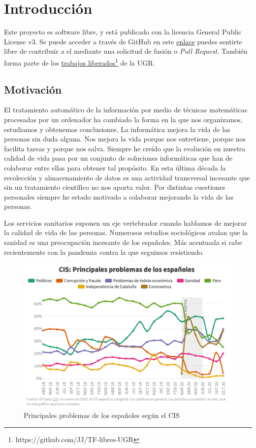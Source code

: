\chapter{Introducción}
Este proyecto es software libre, y está publicado con la licencia \cite{gplv3} General Public License v3.
Se puede acceder a través de GitHub en este \href{https://github.com/pablojjimenez/TFG}{enlace} puedes sentirte libre de contribuir a 
el mediante una solicitud de fusión o \textit{Pull Request}. También forma parte de los \href{https://github.com/JJ/TF-libres-UGR}{trabajos liberados}\footnote{https://github.com/JJ/TF-libres-UGR} de la UGR.

\section{Motivación} 
El tratamiento automático de la información por medio de técnicas matemáticas procesadas por un ordenador 
ha cambiado la forma en la que nos organizamos, estudiamos y obtenemos conclusiones. La informática mejora 
la vida de las personas sin duda alguna. Nos mejora la vida porque nos entretiene, porque nos facilita 
tareas y porque nos salva. Siempre he creído que la evolución en nuestra calidad de vida pasa por un 
conjunto de soluciones informáticas que han de colaborar entre ellas para obtener tal propósito. 
En esta última década la recolección y almacenamiento de datos es una actividad transversal incesante 
que sin un tratamiento científico no nos aporta valor. Por distintas cuestiones personales siempre he 
estado motivado a colaborar mejorando la vida de las personas. 

Los servicios sanitarios suponen un eje vertebrador cuando hablamos de mejorar la calidad
de vida de las personas. Numerosos estudios sociológicos avalan que la sanidad es una 
preocupación incesante de los españoles. Más acentuada si cabe recientemente con la 
pandemia contra la que seguimos resistiendo.
\begin{figure}[]
	\centering	
	\includegraphics[scale=0.5]{doc/logos/imgs/CIS_1.png}
	\caption{ \cite{rtve-cis}  Principales problemas de los españoles según el CIS }
    \label{fig:worst_f_value}
\end{figure}

